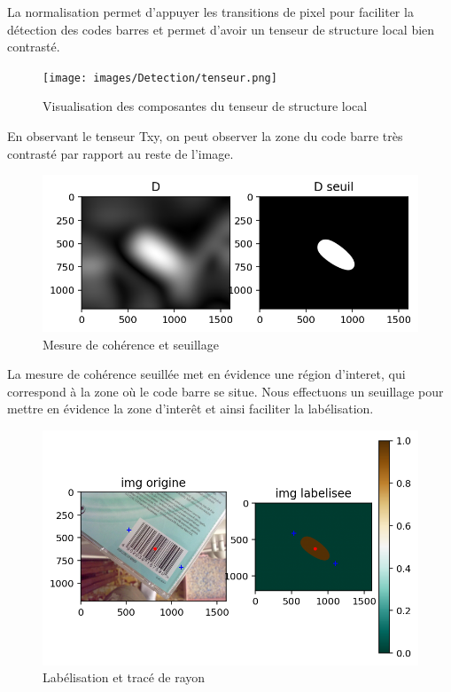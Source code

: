 \documentclass{rapport}
\newcommand{\figsize}{1\textwidth}
\begin{document}
La normalisation permet d'appuyer les transitions de pixel pour faciliter la détection des codes barres et permet d'avoir un tenseur de structure local bien contrasté. 
\begin{figure}[H] 
	\centering
	\texttt{[image: images/Detection/tenseur.png]}
	\caption{Visualisation des composantes du tenseur de structure local}
	\label{tenseur}
\end{figure}
En observant le tenseur Txy, on peut observer la zone du code barre très contrasté par rapport au reste de l'image.

\begin{figure}[H]  
	\centering
	\includegraphics[width=\figsize]{images/Detection/mesure_coherence_seuil.png}
	\caption{Mesure de cohérence et seuillage }
	\label{seuil}
\end{figure}
La mesure de cohérence seuillée met en évidence une région d'interet, qui correspond à la zone où le code barre se situe. Nous effectuons un seuillage pour mettre en évidence la zone d'interêt et ainsi faciliter la labélisation.
\begin{figure}[H]  
	\centering
	\includegraphics[width=\figsize]{images/Detection/img_labeled.png}
	\caption{Labélisation et tracé de rayon}
	\label{seuil}
\end{figure}
\end{document}
